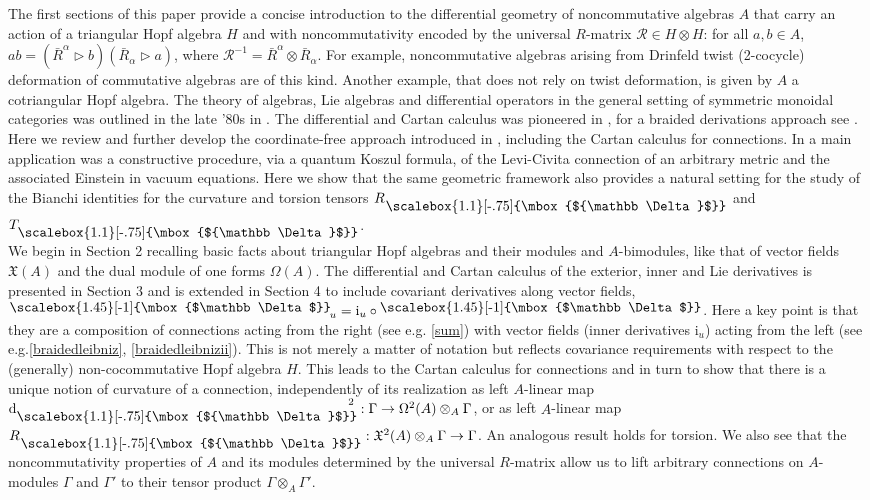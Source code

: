 \documentclass[12pt]{article}
\numberwithin{equation}{section}
\theoremstyle{plain}
\theoremstyle{definition}
\theoremstyle{remark}
\def\Vect{\mathfrak{X}}
\def\oA{\otimes_A}
\def\dd{\mathrm{d}}
\def\ra{\triangleright}
\def\RR{\mathcal{R}}
\def\dd{{\nabla}}
\def\ii{\mathrm{i}}
\def\oR{\bar R}
\def\al{\alpha}
\def\dd{\mathrm{d}}
\def\std{{\raisebox{\depth}{\scalebox{1.45}[-1]{\mbox{$\mathbb \Delta$}}}}_{\!}}
\def\pstd{{}^{\phantom{J}}_{\raisebox{\depth}{\scalebox{1.1}[-.75]{\mbox{${\mathbb
            \Delta}$}}}}}
\def\stD{\dd\pstd}
\def\stD{\dd\pstd}
\def\stdd{\phantom{\!\!\!\dd}\pstd}
\begin{document}
The first sections of this paper provide a concise introduction to the differential geometry of noncommutative algebras $A$
that carry an action of a triangular Hopf algebra $H$ and with noncommutativity
encoded by the universal $R$-matrix $\RR\in H\otimes H$: for all $a,b\in A$, $ab=(\oR^\al\ra b)(\oR_\al\ra a)$, where $\RR^{-1}=\oR^\al\otimes\oR_\al$. For example, noncommutative algebras arising from Drinfeld twist (2-cocycle) deformation of
commutative algebras are of this kind. Another example, that does not
rely on twist deformation, is given by $A$ a cotriangular Hopf
algebra. The theory of algebras, Lie algebras and differential
operators in the general setting of symmetric monoidal categories was outlined in the late '80s in \cite[\S 13.5]{Manin}.  The differential and Cartan calculus was pioneered in \cite{Gurevich}, for a braided derivations approach see \cite{Weber}. 
Here we review and further develop the coordinate-free approach introduced in \cite {LC}, including the Cartan calculus for connections. In \cite {LC} a main application was
a constructive procedure, via a quantum Koszul formula, of the Levi-Civita connection of an arbitrary metric and the associated Einstein in vacuum equations. Here we show that the same geometric framework also provides a natural setting for the study of the Bianchi identities for the curvature and torsion tensors $R\stdd$ and $T\!\stdd$.
\\

We begin in Section 2 recalling basic facts about triangular Hopf
algebras and their modules and $A$-bimodules, like that of vector fields $\Vect(A)$ and the dual module of
one forms $\Omega(A)$.
The differential  and Cartan calculus of the exterior, inner and Lie derivatives  is
presented in Section 3 and is extended in Section 4 to include
covariant derivatives along vector fields, ${\std}_u=\ii_u\circ \std$. Here a key point is that they are a composition of connections acting
from the right (see e.g. \eqref{sum})  with vector fields (inner derivatives $\ii_u$) acting from the left (see e.g.\eqref{braidedleibniz}, \eqref{braidedleibnizii}). 
This is not merely a matter of notation but reflects covariance requirements
with respect to the (generally) non-cocommutative Hopf algebra $H$.
This leads to the Cartan calculus for connections and in turn to show that there is a unique notion of curvature of a connection, independently of its realization as left $A$-linear map ${\stD}^{\!\!\!\!\!2}\,:\Gamma\to\Omega^2(A)\oA \Gamma$, %
or as left $A$-linear map $R\stdd:\Vect^2(A)\oA\Gamma\to\Gamma$. An analogous result holds for torsion.
 We also see that the noncommutativity properties of $A$ and its modules determined by the universal $R$-matrix allow us to lift  arbitrary connections on $A$-modules $\Gamma$ and $\Gamma'$ to their tensor product
$\Gamma\oA\Gamma'$.
\end{document}
